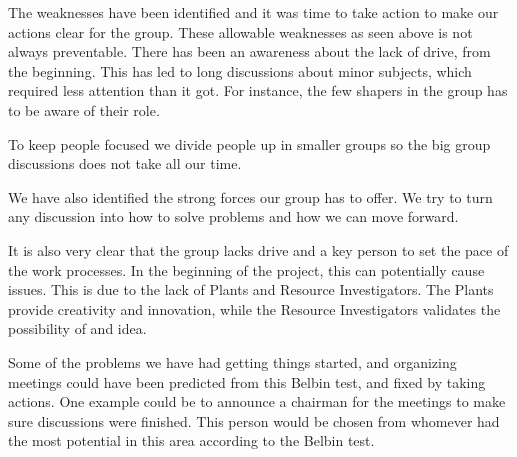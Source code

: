 The weaknesses have been identified and it was time to take action to make our actions clear for the group. 
These allowable weaknesses as seen above is not always preventable. 
There has been an awareness about the lack of drive, from the beginning. 
This has led to long discussions about minor subjects, which required less attention than it got. 
For instance, the few shapers in the group has to be aware of their role. 

To keep people focused we divide people up in smaller groups so the big group discussions does not take all our time.

We have also identified the strong forces our group has to offer.
We try to turn any discussion into how to solve problems and how we can move forward. 

It is also very clear that the group lacks drive and a key person to set the pace of the work processes. In the beginning of the project, this can potentially cause issues. This is due to the lack of Plants and Resource Investigators. The Plants provide creativity and innovation, while the Resource Investigators validates the possibility of and idea.

Some of the problems we have had getting things started, and organizing meetings could have been predicted from this Belbin test, and fixed by taking actions. One example could be to announce a chairman for the meetings to make sure discussions were finished. This person would be chosen from whomever had the most potential in this area according to the Belbin test.


 


